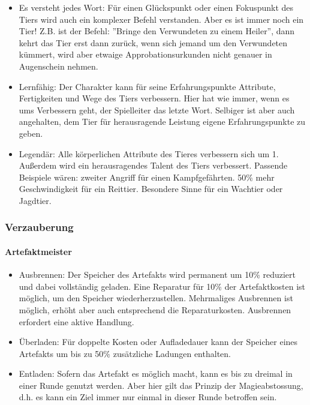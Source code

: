 \documentclass{article}
\begin{document}
\begin{itemize}
\item Es versteht jedes Wort: Für einen Glückspunkt oder einen Fokuspunkt des Tiers wird auch ein komplexer Befehl verstanden. Aber es ist immer noch ein Tier! Z.B. ist der Befehl: ''Bringe den Verwundeten zu einem Heiler'', dann kehrt das Tier erst dann zurück, wenn sich jemand um den Verwundeten kümmert, wird aber etwaige Approbationsurkunden nicht genauer in Augenschein nehmen.
\item Lernfähig: Der Charakter kann für seine Erfahrungspunkte Attribute, Fertigkeiten und Wege des Tiers verbessern. Hier hat wie immer, wenn es ums Verbessern geht, der Spielleiter das letzte Wort. Selbiger ist aber auch angehalten, dem Tier für herausragende Leistung eigene Erfahrungspunkte zu geben.
\item Legendär: Alle körperlichen Attribute des Tieres verbessern sich um 1. Außerdem wird ein herausragendes Talent des Tiers verbessert. Passende Beispiele wären: zweiter Angriff für einen Kampfgefährten. 50\% mehr Geschwindigkeit für ein Reittier. Besondere Sinne für ein Wachtier oder Jagdtier.
\end{itemize}

\subsubsection{Verzauberung}

\paragraph{Artefaktmeister}

\begin{itemize}
\item Ausbrennen: Der Speicher des Artefakts wird permanent um 10\% reduziert und dabei vollständig geladen. Eine Reparatur für 10\% der Artefaktkosten ist möglich, um den Speicher wiederherzustellen. Mehrmaliges Ausbrennen ist möglich, erhöht aber auch entsprechend die Reparaturkosten. Ausbrennen erfordert eine aktive Handlung.
\item Überladen: Für doppelte Kosten oder Aufladedauer kann der Speicher eines Artefakts um bis zu 50\% zusätzliche Ladungen enthalten.
\item Entladen: Sofern das Artefakt es möglich macht, kann es bis zu dreimal in einer Runde genutzt werden. Aber hier gilt das Prinzip der Magieabstossung, d.h. es kann ein Ziel immer nur einmal in dieser Runde betroffen sein.
\end{itemize}
\end{document}
